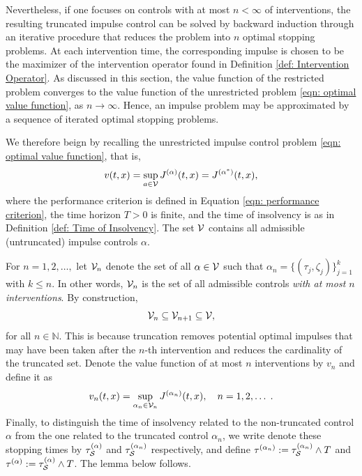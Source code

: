 Nevertheless, if one focuses on controls with at most $n<\infty$ of interventions, the resulting truncated impulse control can be solved by backward induction through an iterative procedure that reduces the problem into $n$ optimal stopping problems. At each intervention time, the corresponding impulse is chosen to be the maximizer of the intervention operator found in Definition \ref{def: Intervention Operator}. As discussed in this section, the value function of the restricted problem converges to the value function of the unrestricted problem \eqref{eqn: optimal value function}, as $n \rightarrow \infty$. Hence, an impulse problem may be approximated by a sequence of iterated optimal stopping problems. 

We therefore beign by recalling the unrestricted impulse control problem \eqref{eqn: optimal value function}, that is,
\begin{equation*}
    v(t,x) = \sup_{a \in \mathcal{V}}J^{(\alpha)}(t,x) = J^{(\alpha^*)}(t,x),
\end{equation*}
where the performance criterion is defined in Equation \eqref{eqn: performance criterion}, the time horizon $T>0$ is finite, and the time of insolvency is as in Definition \ref{def: Time of Insolvency}.  The set $\mathcal{V}$ contains all admissible (untruncated) impulse controls $\alpha$.

For $n=1, 2, \ldots,$ let $\mathcal{V}_n$ denote the set of all $\alpha \in \mathcal{V}$ such that $\alpha_n = \{(\tau_j, \zeta_j)\}_{j=1}^k$ with $k \leq n$. In other words, $\mathcal{V}_n$ is the set of all admissible controls \emph{with at most $n$ interventions}. By construction,
\begin{equation*}
    \mathcal{V}_n  \subseteq \mathcal{V}_{n+1} \subseteq \mathcal{V},
\end{equation*}
for all $n \in \mathbb N$. This is because truncation removes potential optimal impulses that may have been taken after the $n$-th intervention and reduces the cardinality of the truncated set. Denote the value function of at most $n$ interventions by $v_n$ and define it as
\begin{equation}
    v_n(t,x) = \sup_{\alpha_n \in \mathcal{V}_n} J^{(\alpha_n)}(t,x), \quad n=1,2, \ldots \;.
    \label{eqn: value function for at most n interventions}
\end{equation}
Finally, to distinguish the time of insolvency related to the non-truncated control $\alpha$ from the one related to the truncated control $\alpha_n$, we write denote these stopping times by $\tau_{\mathcal{S}}^{(\alpha)}$ and $\tau_{\mathcal{S}}^{(\alpha_n)}$ respectively, and define $\tau^{(\alpha_n)} := \tau_{\mathcal{S}}^{(\alpha_n)}\wedge T$ and $\tau^{(\alpha)} := \tau_{\mathcal{S}}^{(\alpha)} \wedge T$. The lemma below follows.

